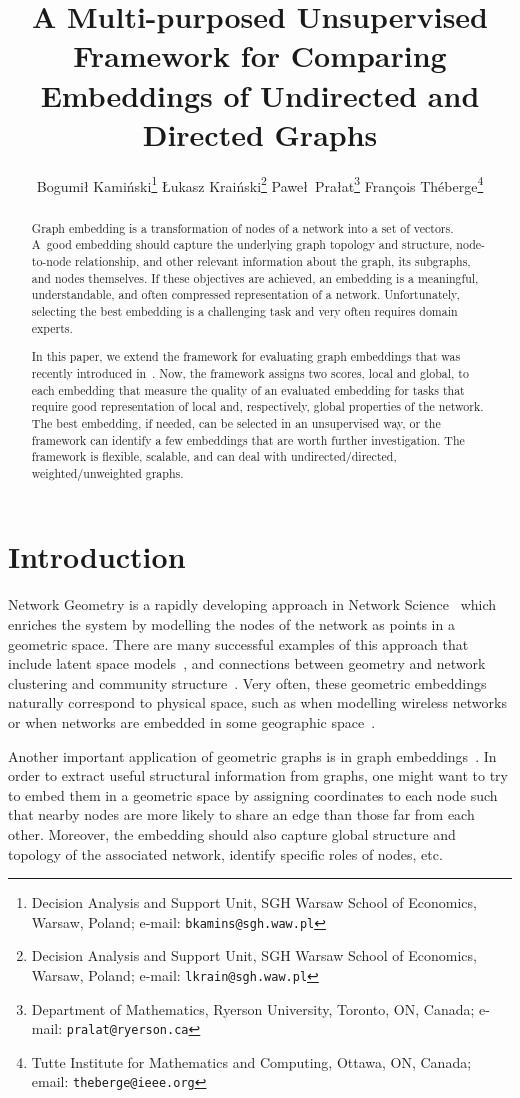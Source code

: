 \documentclass[11pt]{article}
\title{A Multi-purposed Unsupervised Framework for Comparing Embeddings of Undirected and Directed Graphs}
\author{
Bogumi\l{} Kami\'nski\thanks{Decision Analysis and Support Unit, SGH Warsaw School of Economics, Warsaw, Poland; e-mail: \texttt{bkamins@sgh.waw.pl}}
\And
\L{}ukasz Krai\'nski\thanks{Decision Analysis and Support Unit, SGH Warsaw School of Economics, Warsaw, Poland; e-mail: \texttt{lkrain@sgh.waw.pl}}
\And
Pawe\l{}~Pra\l{}at\thanks{Department of Mathematics, Ryerson University, Toronto, ON, Canada; e-mail: \texttt{pralat@ryerson.ca}}
\And
Fran\c{c}ois Th\'eberge\thanks{Tutte Institute for Mathematics and Computing, Ottawa, ON, Canada; email: \texttt{theberge@ieee.org}}
}
\begin{document}
\maketitle

\begin{abstract}
Graph embedding is a transformation of nodes of a network into a set of vectors. A~good embedding should capture the underlying graph topology and structure, node-to-node relationship, and other relevant information about the graph, its subgraphs, and nodes themselves. If these objectives are achieved, an embedding is a meaningful, understandable, and often compressed representation of a network. Unfortunately, selecting the best embedding is a challenging task and very often requires domain experts.

In this paper, we extend the framework for evaluating graph embeddings that was recently introduced in~\cite{Embedding_Complex_Networks}. Now, the framework assigns two scores, local and global, to each embedding that measure the quality of an evaluated embedding for tasks that require good representation of local and, respectively, global properties of the network. The best embedding, if needed, can be selected in an unsupervised way, or the framework can identify a few embeddings that are worth further investigation. The framework is flexible, scalable, and can deal with undirected/directed, weighted/unweighted graphs.
\end{abstract}

\section{Introduction}

Network Geometry is a rapidly developing approach in Network Science~\cite{hoff2002latent} which enriches the system by modelling the nodes of the network as points in a geometric space. There are many successful examples of this approach that include latent space models~\cite{krioukov2016clustering}, and connections between geometry and network clustering and community structure~\cite{zuev2015emergence,gastner2006spatial}. Very often, these geometric embeddings naturally correspond to physical space, such as when modelling wireless networks or when networks are embedded in some geographic space~\cite{expert2011uncovering,janssen2010spatial}. 

Another important application of geometric graphs is in graph embeddings~\cite{aggarwal2021machine}. In order to extract useful structural information from graphs, one might want to try to embed them in a geometric space by assigning coordinates to each node such that nearby nodes are more likely to share an edge than those far from each other. Moreover, the embedding should also capture global structure and topology of the associated network, identify specific roles of nodes, etc. 
\end{document}
